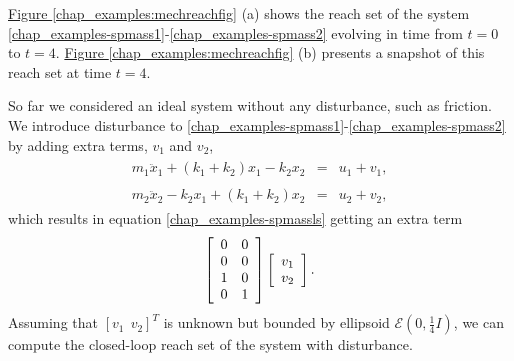 \documentclass[letterpaper,10pt,english]{sphinxmanual}
\begin{document}
\hyperref[chap_examples:mechreachfig]{Figure  \ref*{chap_examples:mechreachfig}} (a) shows the reach set of the system
\eqref{chap_examples-spmass1}-\eqref{chap_examples-spmass2} evolving in time from $t=0$ to $t=4$.
\hyperref[chap_examples:mechreachfig]{Figure  \ref*{chap_examples:mechreachfig}} (b) presents a snapshot of this reach set at time
$t=4$.

So far we considered an ideal system without any disturbance, such as
friction. We introduce disturbance to \eqref{chap_examples-spmass1}-\eqref{chap_examples-spmass2} by adding
extra terms, $v_1$ and $v_2$,
\label{chap_examples:equation-smdist1}\begin{gather}
\begin{split}m_1\ddot{x}_1+(k_1+k_2)x_1-k_2x_2 & = & u_1 + v_1,\end{split}\label{chap_examples-smdist1}
\end{gather}\label{chap_examples:equation-smdist2}\begin{gather}
\begin{split}m_2\ddot{x}_2-k_2x_1+(k_1+k_2)x_2 & = & u_2 + v_2,\end{split}\label{chap_examples-smdist2}
\end{gather}
which results in equation \eqref{chap_examples-spmassls} getting an extra term
\begin{gather}
\begin{split}\left[\begin{array}{cc}
0 & 0\\
0 & 0\\
1 & 0\\
0 & 1\end{array}\right]\left[\begin{array}{c}
v_1\\
v_2\end{array}\right].\end{split}\notag
\end{gather}
Assuming that $[v_1 ~~ v_2]^T$ is unknown but bounded by
ellipsoid ${\mathcal E}(0, \frac{1}{4}I)$, we can compute the
closed-loop reach set of the system with disturbance.
\end{document}
